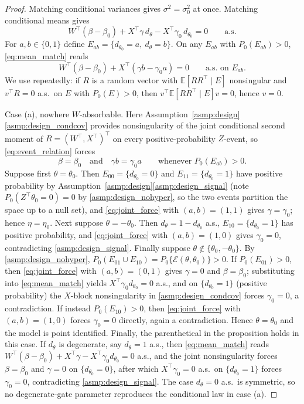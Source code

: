 \documentclass[11pt]{article}
\theoremstyle{definition}
\theoremstyle{plain}
\newcommand{\E}{\mathbb{E}}
\begin{document}
\begin{proof}
Matching conditional variances gives $\sigma^2=\sigma_0^2$ at once. Matching conditional means gives
\begin{equation}
W^\top(\beta-\beta_0)+X^\top\gamma\,d_\theta-X^\top\gamma_0\,d_{\theta_0}=0
\qquad\text{a.s.}
\label{eq:mean_match}
\end{equation}
For $a,b\in\{0,1\}$ define $E_{ab}=\{d_{\theta_0}=a,\ d_\theta=b\}$. On any $E_{ab}$ with $P_0(E_{ab})>0$, \eqref{eq:mean_match} reads
\begin{equation}
W^\top(\beta-\beta_0)+X^\top(\gamma b-\gamma_0 a)=0\qquad\text{a.s.\ on }E_{ab}.
\label{eq:event_relation}
\end{equation}
We use repeatedly: if $R$ is a random vector with $\E[RR^\top\mid E]$ nonsingular and $v^\top R=0$ a.s.\ on $E$ with $P_0(E)>0$, then $v^\top\E[RR^\top\mid E]v=0$, hence $v=0$.

Case (a), nowhere $W$-absorbable. Here Assumption~\ref{asmp:design}\ref{asmp:design_condcov} provides nonsingularity of the joint conditional second moment of $R=(W^\top,X^\top)^\top$ on every positive-probability $Z$-event, so \eqref{eq:event_relation} forces
\begin{equation}
\beta=\beta_0
\quad\text{and}\quad
\gamma b=\gamma_0 a
\qquad\text{whenever }P_0(E_{ab})>0.
\label{eq:joint_force}
\end{equation}
Suppose first $\theta=\theta_0$. Then $E_{00}=\{d_{\theta_0}=0\}$ and $E_{11}=\{d_{\theta_0}=1\}$ have positive probability by Assumption~\ref{asmp:design}\ref{asmp:design_signal} (note $P_0(Z^\top\theta_0=0)=0$ by \ref{asmp:design_nohyper}, so the two events partition the space up to a null set), and \eqref{eq:joint_force} with $(a,b)=(1,1)$ gives $\gamma=\gamma_0$; hence $\eta=\eta_0$. Next suppose $\theta=-\theta_0$. Then $d_\theta=1-d_{\theta_0}$ a.s., $E_{10}=\{d_{\theta_0}=1\}$ has positive probability, and \eqref{eq:joint_force} with $(a,b)=(1,0)$ gives $\gamma_0=0$, contradicting \ref{asmp:design_signal}. Finally suppose $\theta\notin\{\theta_0,-\theta_0\}$. By \ref{asmp:design_nohyper}, $P_0(E_{01}\cup E_{10})=P_0\{\mathcal E(\theta,\theta_0)\}>0$. If $P_0(E_{01})>0$, then \eqref{eq:joint_force} with $(a,b)=(0,1)$ gives $\gamma=0$ and $\beta=\beta_0$; substituting into \eqref{eq:mean_match} yields $X^\top\gamma_0d_{\theta_0}=0$ a.s., and on $\{d_{\theta_0}=1\}$ (positive probability) the $X$-block nonsingularity in \ref{asmp:design_condcov} forces $\gamma_0=0$, a contradiction. If instead $P_0(E_{10})>0$, then \eqref{eq:joint_force} with $(a,b)=(1,0)$ forces $\gamma_0=0$ directly, again a contradiction. Hence $\theta=\theta_0$ and the model is point identified. Finally, the parenthetical in the proposition holds in this case. If $d_\theta$ is degenerate, say $d_\theta=1$ a.s., then \eqref{eq:mean_match} reads $W^\top(\beta-\beta_0)+X^\top\gamma-X^\top\gamma_0 d_{\theta_0}=0$ a.s., and the joint nonsingularity forces $\beta=\beta_0$ and $\gamma=0$ on $\{d_{\theta_0}=0\}$, after which $X^\top\gamma_0=0$ a.s.\ on $\{d_{\theta_0}=1\}$ forces $\gamma_0=0$, contradicting \ref{asmp:design_signal}. The case $d_\theta=0$ a.s.\ is symmetric, so no degenerate-gate parameter reproduces the conditional law in case (a).


\end{proof}
\end{document}
